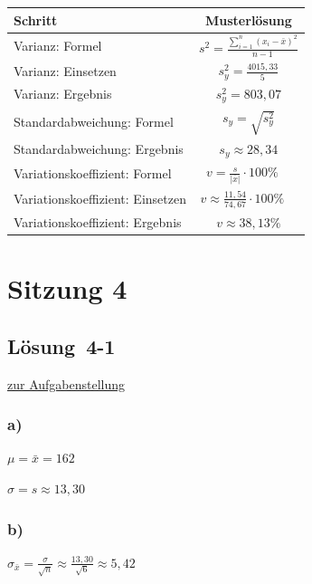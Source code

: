 \documentclass[
  11pt,
  ngerman,
  a4paper,
]{report}
\begin{document}
\begin{table}[H]
\centering
\begin{tabular}{lc}
\toprule
Schritt & Musterlösung\\
\midrule
Varianz: Formel & $s^2=\frac{\sum\limits_{i=1}^{n}(x_{i}-\bar{x})^2}{n-1}$\\
Varianz: Einsetzen & $s^2_y=\frac{4015{,}33}{5}$\\
Varianz: Ergebnis & $s^2_y=803{,}07$\\
Standardabweichung: Formel & $s_y=\sqrt{s^2_y}$\\
Standardabweichung: Ergebnis & $s_y\approx28{,}34$\\
Variationskoeffizient: Formel & $v=\frac{s}{|\bar{x}|}\cdot100\%\quad$\\
Variationskoeffizient: Einsetzen & $v\approx\frac{11,54}{74,67}\cdot100\%\quad$\\
Variationskoeffizient: Ergebnis & $v \approx 38{,}13\%$\\
\bottomrule
\end{tabular}
\end{table}

\hypertarget{sitzung-4}{%
\section*{Sitzung 4}\label{sitzung-4}}

\hypertarget{loesung-4-1}{%
\subsection{Lösung~4-1}\label{loesung-4-1}}

\protect\hyperlink{aufgabe-4-1}{zur Aufgabenstellung}

\hypertarget{a-14}{%
\subsubsection{a)}\label{a-14}}

\(\mu = \bar{x} = 162\)

\(\sigma = s \approx 13{,}30\)

\hypertarget{b-14}{%
\subsubsection{b)}\label{b-14}}

\(\sigma_{\bar{x}} = \frac{\sigma}{\sqrt{n}}\approx\frac{13{,}30}{\sqrt{6}} \approx 5,42\)
\end{document}
